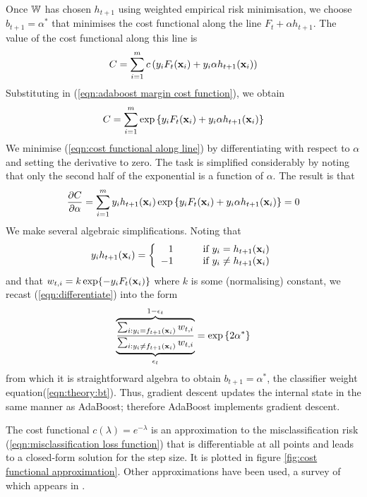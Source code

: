 Once $\mathbb{W}$ has chosen $h_{t+1}$ using weighted empirical risk
minimisation, we choose $b_{t+1} = \alpha^{\ast}$ that minimises the
cost functional along the line $F_t + \alpha h_{t+1}$.  The value of
the cost functional along this line is
%
\begin{equation}
C = \sum_{i=1}^{m} c \left( y_i F_t(\mathbf{x}_i) + y_i \alpha
h_{t+1}(\mathbf{x}_i) \right)
\end{equation}
%
Substituting in (\ref{eqn:adaboost margin cost function}), we obtain
%
\begin{equation}
C = \sum_{i=1}^{m} \exp \left\{ y_i F_t(\mathbf{x}_i) + y_i \alpha
h_{t+1}(\mathbf{x}_i) \right\}
\label{eqn:cost functional along line}
\end{equation}
%
We minimise (\ref{eqn:cost functional along line}) by
differentiating with respect to $\alpha$ and setting the derivative to
zero.  The task is simplified considerably by noting that only the
second half of the exponential is a function of $\alpha$.  The result
is that
%
\begin{equation}
\label{eqn:differentiate}
\frac{\partial C}{\partial \alpha}
= \sum_{i=1}^{m} y_i h_{t+1}(\mathbf{x}_i) \exp \left\{ y_i F_t(\mathbf{x}_i) +
y_i \alpha h_{t+1}(\mathbf{x}_i) \right\} = 0
\end{equation}
%
We make several algebraic simplifications.  Noting that
%
\begin{equation}
y_i h_{t+1}(\mathbf{x}_i) = \left\{ 
	\begin{array}{rl}
	1 &	\qquad \mbox{if $y_i = h_{t+1}(\mathbf{x}_i)$} \\
	-1 &	\qquad \mbox{if $y_i \neq h_{t+1}(\mathbf{x}_i)$}
	\end{array}
\right. 
\end{equation}
%
and that $w_{t,i} = k \exp \{ -y_i F_t(\mathbf{x}_i) \}$ where $k$ is some
(normalising) constant, we recast (\ref{eqn:differentiate}) into
the form 
%
\begin{equation}
\overbrace{
\underbrace{
	\frac{\sum_{i : y_i = f_{t+1}(\mathbf{x}_i)} w_{t,i}}
	     {\sum_{i : y_i \neq f_{t+1}(\mathbf{x}_i)} w_{t,i}}
}_{\epsilon_t}
}^{1 - \epsilon_t}
= \exp \left\{ 2 \alpha^{\ast} \right\} 
\end{equation}
%
from which it is straightforward algebra to obtain $b_{t+1} =
\alpha^{\ast}$, the classifier weight
equation(\ref{eqn:theory:bt}). Thus, gradient descent updates the
internal state in the same manner as AdaBoost; therefore AdaBoost
implements gradient descent.

The cost functional $c(\lambda) = e^{-\lambda}$ is an approximation to
the misclassification risk (\ref{eqn:misclassification loss function})
that is differentiable at all points and leads to a closed-form
solution for the step size.  It is plotted in figure \ref{fig:cost
functional approximation}.  Other approximations have been used, a
survey of which appears in \cite{Mason99}.

